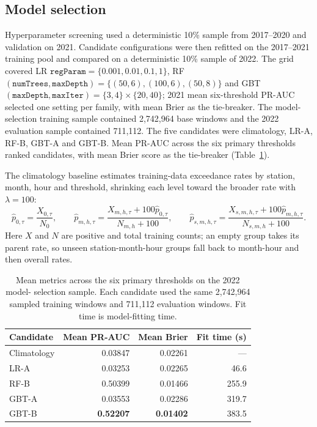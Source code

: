 \subsection{Model selection}
Hyperparameter screening used a deterministic 10\% sample from 2017--2020
and validation on 2021. Candidate configurations were then refitted on the
2017--2021 training pool and compared on a deterministic 10\% sample of 2022.
The grid covered LR $\texttt{regParam}=\{0.001,0.01,0.1,1\}$, RF
$(\texttt{numTrees},\texttt{maxDepth})=\{(50,6),(100,6),(50,8)\}$ and GBT
$(\texttt{maxDepth},\texttt{maxIter})=\{3,4\}\times\{20,40\}$; 2021 mean
six-threshold PR-AUC selected one setting per family, with mean Brier as the
tie-breaker.
The model-selection training sample contained 2,742,964 base windows and the
2022 evaluation sample contained 711,112. The five candidates were
climatology, LR-A, RF-B, GBT-A and GBT-B. Mean PR-AUC across the six primary
thresholds ranked candidates, with mean Brier score as the tie-breaker
(Table~\ref{tab:selection}).

The climatology baseline estimates training-data exceedance rates by station,
month, hour and threshold, shrinking each level toward the broader rate with
$\lambda=100$:
\[
  \hat p_{0,\tau}=\frac{X_{0,\tau}}{N_0},\qquad
  \hat p_{m,h,\tau}=\frac{X_{m,h,\tau}+100\hat p_{0,\tau}}{N_{m,h}+100},\qquad
  \hat p_{s,m,h,\tau}=\frac{X_{s,m,h,\tau}+100\hat p_{m,h,\tau}}{N_{s,m,h}+100}.
\]
Here $X$ and $N$ are positive and total training counts; an empty group takes
its parent rate, so unseen station-month-hour groups fall back to month-hour
and then overall rates.

\begin{table}[htbp]
\centering\small
\caption{Mean metrics across the six primary thresholds on the 2022 model-
selection sample. Each candidate used the same 2,742,964 sampled training
windows and 711,112 evaluation windows. Fit time is model-fitting time.}
\label{tab:selection}
\begin{tabular}{l r r r}
\toprule
Candidate & Mean PR-AUC & Mean Brier & Fit time (s) \\
\midrule
Climatology & 0.03847 & 0.02261 & --- \\
LR-A & 0.03253 & 0.02265 & 46.6 \\
RF-B & 0.50399 & 0.01466 & 255.9 \\
GBT-A & 0.03553 & 0.02286 & 319.7 \\
GBT-B & \textbf{0.52207} & \textbf{0.01402} & 383.5 \\
\bottomrule
\end{tabular}
\end{table}

